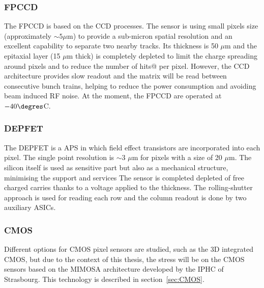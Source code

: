    \subsubsection{FPCCD}
   
     The \gls{FPCCD} \cite{CalanchaParedes} is based on the \gls{CCD} processes.
     The sensor is using small pixels size (approximately $\sim 5 \mu\text{m}$) to provide a sub-micron spatial resolution and an excellent capability to separate two nearby tracks.
     Its thickness is 50 $\mu\text{m}$ and the epitaxial layer (15 $\mu\text{m}$ thick) is completely depleted to limit the charge spreading around pixels and to reduce the number of hits@ per pixel.
     However, the \gls{CCD} architecture provides slow readout and the matrix will be read between consecutive bunch trains, helping to reduce the power consumption and avoiding beam induced RF noise.
     At the moment, the \gls{FPCCD} are operated at $-40 \degres$C.

   \subsubsection{DEPFET}
    
    The \gls{DEPFET}  is a \gls{APS} in which field effect transistors are incorporated into each pixel.
    The single point resolution is $\sim 3$ $\mu\text{m}$ for pixels with a size of 20 $\mu\text{m}$.
    The silicon itself is used as sensitive part but also as a mechanical structure, minimising the support and services
    The sensor is completed depleted of free charged carries thanks to a voltage applied to the thickness.
    The rolling-shutter approach is used for reading each row and the column readout is done by two auxiliary \glspl{ASIC}.


   \subsubsection{CMOS}

   Different options for \gls{CMOS} pixel sensors are studied, such as the 3D integrated \gls{CMOS}, but due to the context of this thesis, the stress will be on the \gls{CMOS} sensors based on the \gls{MIMOSA} architecture developed by the IPHC of Strasbourg. 
   This technology is described in section~\ref{sec:CMOS}.


